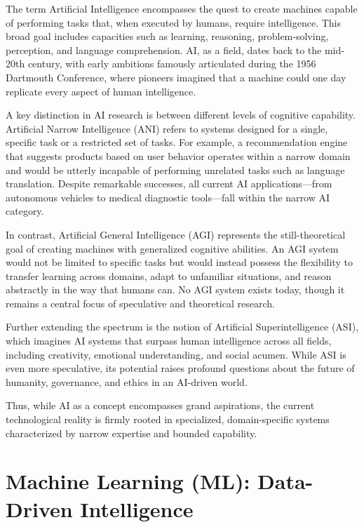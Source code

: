\documentclass{book}
\begin{document}
The term Artificial Intelligence encompasses the quest to create machines 
capable of performing tasks that, when executed by humans, require intelligence.
This broad goal includes capacities such as learning, reasoning, 
problem-solving, perception, and language comprehension. AI, as a field, dates 
back to the mid-20th century, with early ambitions famously articulated during 
the 1956 Dartmouth Conference, where pioneers imagined that a machine could one 
day replicate every aspect of human intelligence.

A key distinction in AI research is between different levels of cognitive 
capability. Artificial Narrow Intelligence (ANI) refers to systems designed for 
a single, specific task or a restricted set of tasks. For example, a 
recommendation engine that suggests products based on user behavior operates 
within a narrow domain and would be utterly incapable of performing unrelated 
tasks such as language translation. Despite remarkable successes, all current AI
applications—from autonomous vehicles to medical diagnostic tools—fall within 
the narrow AI category.

In contrast, Artificial General Intelligence (AGI) represents the 
still-theoretical goal of creating machines with generalized cognitive 
abilities. An AGI system would not be limited to specific tasks but would 
instead possess the flexibility to transfer learning across domains, adapt to 
unfamiliar situations, and reason abstractly in the way that humans can. No AGI 
system exists today, though it remains a central focus of speculative and 
theoretical research.

Further extending the spectrum is the notion of Artificial Superintelligence 
(ASI), which imagines AI systems that surpass human intelligence across all 
fields, including creativity, emotional understanding, and social acumen. While 
ASI is even more speculative, its potential raises profound questions about the 
future of humanity, governance, and ethics in an AI-driven world.

Thus, while AI as a concept encompasses grand aspirations, the current 
technological reality is firmly rooted in specialized, domain-specific systems 
characterized by narrow expertise and bounded capability.

\section{Machine Learning (ML): Data-Driven Intelligence}
\end{document}
